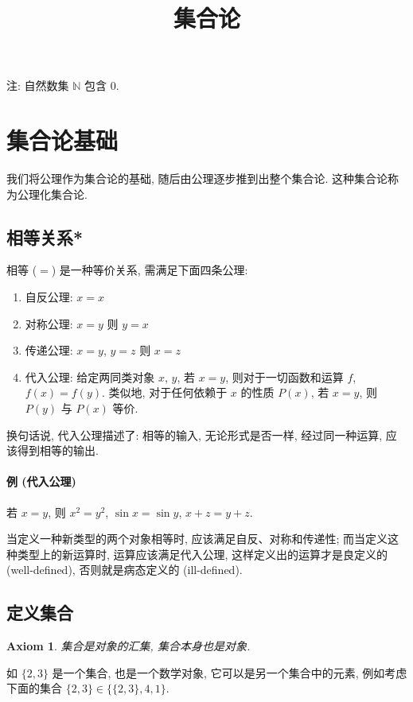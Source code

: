 \documentclass[UTF8]{ctexart}
\title{集合论}
\theoremstyle{mystyle}
\newtheorem{axiom}{Axiom}[section]
\theoremstyle{myremark}
\theoremstyle{plain}
\newcommand{\N}{\mathbb N}
\begin{document}
\maketitle
\tableofcontents

\newpage
注: 自然数集 $ \N $ 包含 $ 0 $.

\section{集合论基础}
我们将公理作为集合论的基础, 随后由公理逐步推到出整个集合论. 这种集合论称为公理化集合论.

\subsection{相等关系*} 
相等 ($ = $) 是一种等价关系, 需满足下面四条公理:
\begin{enumerate}
    \item 自反公理: $ x = x $
    \item 对称公理: $ x = y $ 则 $ y = x $
    \item 传递公理: $ x = y $, $ y = z $ 则 $ x = z $
    \item 代入公理: 给定两同类对象 $ x $, $ y $, 若 $ x = y $, 则对于一切函数和运算 $ f $, $ f(x) = f(y) $. 类似地, 对于任何依赖于 $ x $ 的性质 $ P(x) $, 若 $ x = y $, 则 $ P(y) $ 与 $ P(x) $ 等价.
\end{enumerate}

换句话说, 代入公理描述了: 相等的输入, 无论形式是否一样, 经过同一种运算, 应该得到相等的输出.

\paragraph{例 (代入公理)} 若 $ x = y $, 则 $ x^2 = y^2 $, $ \sin x = \sin y $, $ x + z = y + z $.

当定义一种新类型的两个对象相等时, 应该满足自反、对称和传递性; 而当定义这种类型上的新运算时, 运算应该满足代入公理, 这样定义出的运算才是良定义的 (well-defined), 否则就是病态定义的 (ill-defined).

\subsection{定义集合}
\begin{axiom}
    集合是对象的汇集, 集合本身也是对象. 
\end{axiom}

如 $ \{2, 3\} $ 是一个集合, 也是一个数学对象, 它可以是另一个集合中的元素, 例如考虑下面的集合 $ \{2, 3\} \in \{\{2, 3\}, 4, 1\} $.
\end{document}
